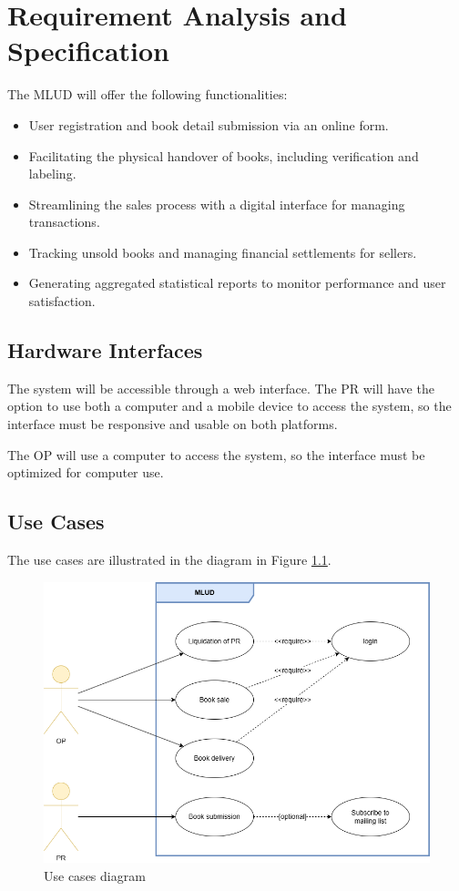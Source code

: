 \chapter{Requirement Analysis and Specification}

The MLUD will offer the following functionalities:
\begin{itemize}
    \item User registration and book detail submission via an online form.
    \item Facilitating the physical handover of books, including verification and labeling.
    \item Streamlining the sales process with a digital interface for managing transactions.
    \item Tracking unsold books and managing financial settlements for sellers.
    \item Generating aggregated statistical reports to monitor performance and user satisfaction.
\end{itemize}

\section{Hardware Interfaces}
The system will be accessible through a web interface. The PR will have the option to use both a computer and a mobile device to access the system, so the interface must be responsive and usable on both platforms.

The OP will use a computer to access the system, so the interface must be optimized for computer use.

\section{Use Cases}

The use cases are illustrated in the diagram in Figure \ref{fig:use_cases}.

\begin{figure}[h]
    \centering
    \includegraphics[width=.75\textwidth]{assets/use_cases_diagram.png}
    \caption{Use cases diagram}
    \label{fig:use_cases}
\end{figure}

